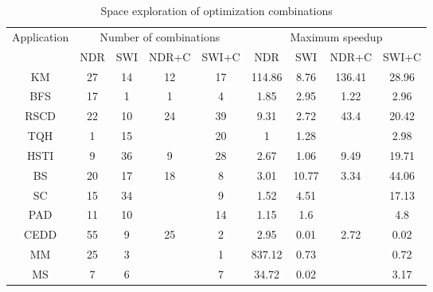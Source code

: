 \begin{table}%
	\centering
	\begin{scriptsize}
		\begin{tabular}{|c|c|c|c|c|c|c|c|c|}
			\hline
		    \multirow{2}{*}{Application} & \multicolumn{4}{c|}{Number of combinations} & \multicolumn{4}{c|}{Maximum speedup} \\
         \cline{2-9}
			
			& NDR & SWI & NDR+C & SWI+C & NDR & SWI & NDR+C & SWI+C \\
			
			\hline
			KM & 27 & 14 & 12 & 17 & 114.86 & 8.76 & 136.41 & 28.96 \\
			\hline
			BFS & 17 & 1 & 1 & 4 
			& 1.85 & 2.95 & 1.22 & 2.96 \\ 
			\hline
			RSCD & 22 & 10 & 24 & 39 & 9.31 & 2.72 & 43.4 & 20.42 \\
			\hline
			TQH & 1 & 15 & & 20 & 1 & 1.28 & & 2.98 \\
			\hline
			HSTI & 9 & 36 & 9 & 28 & 2.67 & 1.06 & 9.49 & 19.71 \\
			\hline
			BS & 20 & 17 & 18 & 8 & 3.01 & 10.77 & 3.34 & 44.06 \\
			\hline
			SC & 15 & 34 & & 9 & 1.52 & 4.51 &  & 17.13 \\
			\hline
			PAD & 11 & 10 && 14 & 1.15 & 1.6 &  & 4.8 \\
			\hline
			CEDD & 55 & 9 & 25 & 2 & 2.95 & 0.01 & 2.72 & 0.02 \\
			\hline
			MM & 25 & 3 && 1 & 837.12 & 0.73 & & 0.72 \\
			\hline
			MS & 7 & 6 && 7 & 34.72 & 0.02 & & 3.17  \\
			
			\hline
		\end{tabular}
	\end{scriptsize}
	\caption{Space exploration of optimization combinations }
	\label{t_optimization_combination}
	\vspace{-5ex}
\end{table}





 


\vspace{-1ex}
